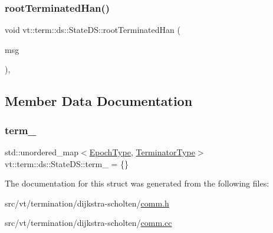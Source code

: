 \subsubsection{\texorpdfstring{root\+Terminated\+Han()}{rootTerminatedHan()}}
{\footnotesize\ttfamily void vt\+::term\+::ds\+::\+State\+D\+S\+::root\+Terminated\+Han (\begin{DoxyParamCaption}\item[{\hyperlink{structvt_1_1term_1_1ds_1_1_ack_msg}{Ack\+Msg} $\ast$}]{msg }\end{DoxyParamCaption})\hspace{0.3cm}{\ttfamily [static]}, {\ttfamily [private]}}



\subsection{Member Data Documentation}
\mbox{\label{structvt_1_1term_1_1ds_1_1_state_d_s_a97a12b9645ebe99171d7680baab34b5d}} 
\subsubsection{\texorpdfstring{term\+\_\+}{term\_}}
{\footnotesize\ttfamily std\+::unordered\+\_\+map$<$\hyperlink{namespacevt_a81d11b28122d43bf9834577e4a06440f}{Epoch\+Type}, \hyperlink{structvt_1_1term_1_1ds_1_1_state_d_s_af98cfe31c25f710273ee103026d538e4}{Terminator\+Type}$>$ vt\+::term\+::ds\+::\+State\+D\+S\+::term\+\_\+ = \{\}\hspace{0.3cm}{\ttfamily [protected]}}



The documentation for this struct was generated from the following files\+:\begin{DoxyCompactItemize}
\item 
src/vt/termination/dijkstra-\/scholten/\hyperlink{comm_8h}{comm.\+h}\item 
src/vt/termination/dijkstra-\/scholten/\hyperlink{comm_8cc}{comm.\+cc}\end{DoxyCompactItemize}
